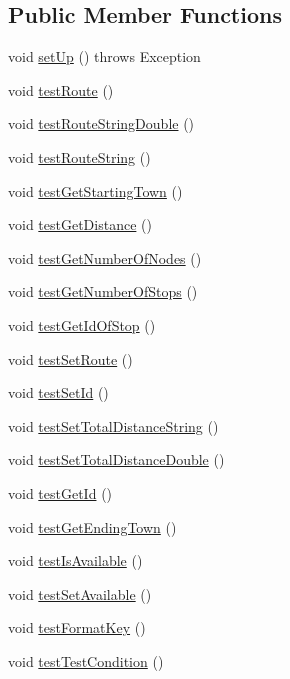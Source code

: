 \subsection*{Public Member Functions}
\begin{DoxyCompactItemize}
\item 
void \hyperlink{classtest_1_1_route_test_a8769c6c9998f3d9ac16d3b9eba8852cb}{set\+Up} ()  throws Exception 
\item 
void \hyperlink{classtest_1_1_route_test_a7f25c69e5d23bf66b691c488755dbfc9}{test\+Route} ()
\item 
void \hyperlink{classtest_1_1_route_test_a52c3fdb8ab37480b0fecd7e9b6fa0f06}{test\+Route\+String\+Double} ()
\item 
void \hyperlink{classtest_1_1_route_test_acb2270c45a7b7d0b4abf79c096f06db1}{test\+Route\+String} ()
\item 
void \hyperlink{classtest_1_1_route_test_a7dacc77eab109864a56245621d7ec28e}{test\+Get\+Starting\+Town} ()
\item 
void \hyperlink{classtest_1_1_route_test_af066f97eb9ba4d89e2c3305da7160a2b}{test\+Get\+Distance} ()
\item 
void \hyperlink{classtest_1_1_route_test_a11cca1688e58c33a830799aabf3c193f}{test\+Get\+Number\+Of\+Nodes} ()
\item 
void \hyperlink{classtest_1_1_route_test_af6681e248b53ea74f2b330d454b41798}{test\+Get\+Number\+Of\+Stops} ()
\item 
void \hyperlink{classtest_1_1_route_test_acaeec305d3d55c8bc78e90799de36632}{test\+Get\+Id\+Of\+Stop} ()
\item 
void \hyperlink{classtest_1_1_route_test_ac1ec1e0a746b686d4e3c2ced9224b8d7}{test\+Set\+Route} ()
\item 
void \hyperlink{classtest_1_1_route_test_ab08c94959831d50b6350a697b55ca248}{test\+Set\+Id} ()
\item 
void \hyperlink{classtest_1_1_route_test_a8e80ff61aae3fce1b14e526b8b09ca40}{test\+Set\+Total\+Distance\+String} ()
\item 
void \hyperlink{classtest_1_1_route_test_aba13b05ba3749e36d917203df57c0c4f}{test\+Set\+Total\+Distance\+Double} ()
\item 
void \hyperlink{classtest_1_1_route_test_ae5d74fb8dedad7c5ee9d7aa1f6e181ca}{test\+Get\+Id} ()
\item 
void \hyperlink{classtest_1_1_route_test_a892b2d6667e4202a15746f84018d2efb}{test\+Get\+Ending\+Town} ()
\item 
void \hyperlink{classtest_1_1_route_test_a524fd5dc10dd4319d44b20607e99c0a2}{test\+Is\+Available} ()
\item 
void \hyperlink{classtest_1_1_route_test_a800664a2fbe5f7c806114a4a9e576529}{test\+Set\+Available} ()
\item 
void \hyperlink{classtest_1_1_route_test_a8c73ab3b303390810fb4bae9740c68a5}{test\+Format\+Key} ()
\item 
void \hyperlink{classtest_1_1_route_test_a9555de1650cfe22c915c127f07c900ab}{test\+Test\+Condition} ()
\end{DoxyCompactItemize}
